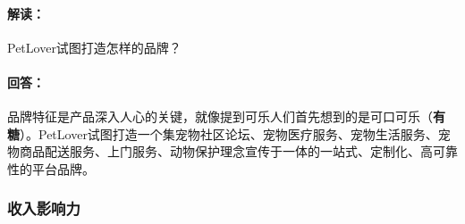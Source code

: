 \documentclass[a4paper]{ctexart}
\begin{document}
\begin{enumerate}[label=\alph*.]
  \paragraph{解读：}PetLover试图打造怎样的品牌？
  \paragraph{回答：}品牌特征是产品深入人心的关键，就像提到可乐人们首先想到的是可口可乐（\textbf{有糖}）。PetLover试图打造一个集宠物社区论坛、宠物医疗服务、宠物生活服务、宠物商品配送服务、上门服务、动物保护理念宣传于一体的一站式、定制化、高可靠性的平台品牌。
\end{enumerate}

\subsubsection{收入影响力}
\end{document}
